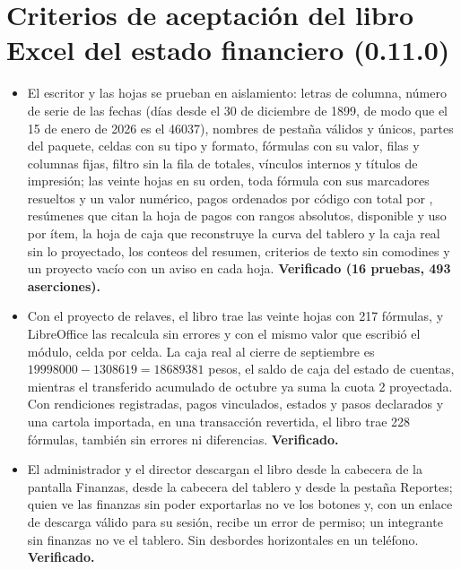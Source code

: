 \documentclass[11pt,a4paper]{article}
\begin{document}
\section{Criterios de aceptación del libro Excel del estado financiero (0.11.0)}

\begin{itemize}
\item El escritor y las hojas se prueban en aislamiento: letras de columna, número de serie de las fechas (días desde el 30 de diciembre de 1899, de modo que el 15 de enero de 2026 es el \num{46037}), nombres de pestaña válidos y únicos, partes del paquete, celdas con su tipo y formato, fórmulas con su valor, filas y columnas fijas, filtro sin la fila de totales, vínculos internos y títulos de impresión; las veinte hojas en su orden, toda fórmula con sus marcadores resueltos y un valor numérico, pagos ordenados por código con total por , resúmenes que citan la hoja de pagos con rangos absolutos, disponible y uso por ítem, la hoja de caja que reconstruye la curva del tablero y la caja real sin lo proyectado, los conteos del resumen, criterios de texto sin comodines y un proyecto vacío con un aviso en cada hoja. \textbf{Verificado (16 pruebas, 493 aserciones).}
\item Con el proyecto de relaves, el libro trae las veinte hojas con 217 fórmulas, y LibreOffice las recalcula sin errores y con el mismo valor que escribió el módulo, celda por celda. La caja real al cierre de septiembre es $\num{19998000}-\num{1308619}=\num{18689381}$ pesos, el saldo de caja del estado de cuentas, mientras el transferido acumulado de octubre ya suma la cuota 2 proyectada. Con rendiciones registradas, pagos vinculados, estados y pasos declarados y una cartola importada, en una transacción revertida, el libro trae 228 fórmulas, también sin errores ni diferencias. \textbf{Verificado.}
\item El administrador y el director descargan el libro desde la cabecera de la pantalla Finanzas, desde la cabecera del tablero y desde la pestaña Reportes; quien ve las finanzas sin poder exportarlas no ve los botones y, con un enlace de descarga válido para su sesión, recibe un error de permiso; un integrante sin finanzas no ve el tablero. Sin desbordes horizontales en un teléfono. \textbf{Verificado.}
\end{itemize}
\end{document}

